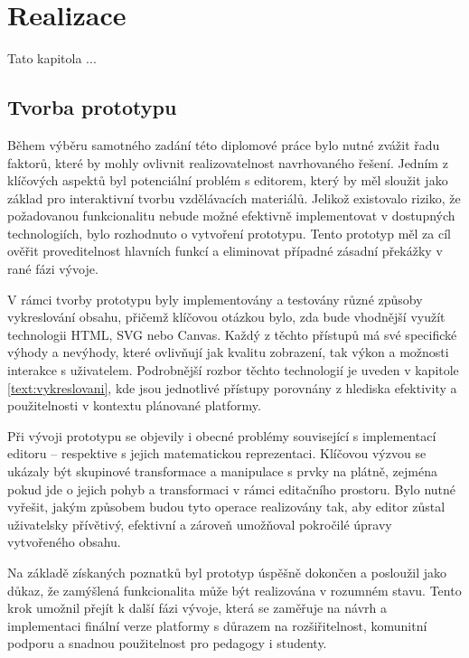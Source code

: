 \chapter{Realizace}

\begin{chapterabstract}
Tato kapitola ...
\end{chapterabstract}

\section{Tvorba prototypu}


Během výběru samotného zadání této diplomové práce bylo nutné zvážit řadu faktorů, které by mohly ovlivnit realizovatelnost navrhovaného řešení. 
Jedním z klíčových aspektů byl potenciální problém s editorem, který by měl sloužit jako základ pro interaktivní tvorbu vzdělávacích materiálů. 
Jelikož existovalo riziko, že požadovanou funkcionalitu nebude možné efektivně implementovat v dostupných technologiích, bylo rozhodnuto o vytvoření prototypu. 
Tento prototyp měl za cíl ověřit proveditelnost hlavních funkcí a eliminovat případné zásadní překážky v rané fázi vývoje.

V rámci tvorby prototypu byly implementovány a testovány různé způsoby vykreslování obsahu, přičemž klíčovou otázkou bylo, zda bude vhodnější využít technologii HTML, SVG nebo Canvas.
Každý z těchto přístupů má své specifické výhody a nevýhody, které ovlivňují jak kvalitu zobrazení, tak výkon a možnosti interakce s uživatelem. 
Podrobnější rozbor těchto technologií je uveden v kapitole \ref{text:vykreslovani}, kde jsou jednotlivé přístupy porovnány z hlediska efektivity a použitelnosti v kontextu plánované platformy.

Při vývoji prototypu se objevily i obecné problémy související s implementací editoru -- respektive s jejich matematickou reprezentaci. 
Klíčovou výzvou se ukázaly být skupinové transformace a manipulace s prvky na plátně, zejména pokud jde o jejich pohyb a transformaci v rámci editačního prostoru.
Bylo nutné vyřešit, jakým způsobem budou tyto operace realizovány tak, aby editor zůstal uživatelsky přívětivý, efektivní a zároveň umožňoval pokročilé úpravy vytvořeného obsahu.

Na základě získaných poznatků byl prototyp úspěšně dokončen a posloužil jako důkaz, že zamýšlená funkcionalita může být realizována v rozumném stavu. 
Tento krok umožnil přejít k další fázi vývoje, která se zaměřuje na návrh a implementaci finální verze platformy s důrazem na rozšiřitelnost, komunitní podporu a snadnou použitelnost pro pedagogy i studenty.

